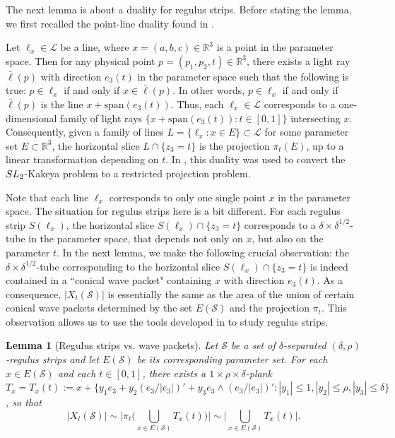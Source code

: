 \documentclass{amsart}%
\numberwithin{equation}{section}
\newtheorem{lemma}[theorem]{Lemma}
\newcommand{\de}{\delta}
\newcommand{\cs}{\mathcal S}
\newcommand{\cl}{\mathcal L}
\newcommand{\ZR}{\mathbb{R}}
\newcommand{\SL}{{\rm{SL}}}
\newcommand{\1}{\mathbbm{1}}
\begin{document}
\smallskip

The next lemma is about a duality for regulus strips.
Before stating the lemma, we first recalled the point-line duality found in \cite{FO}.

Let $\ell_{x}\in\cl$ be a line, where $x=(a,b,c)\in\ZR^3$ is a point in the parameter space.
Then for any physical point $p=(p_1,p_2,t)\in\ZR^3$, there exists a light ray $\bar\ell(p)$ with direction $e_3(t)$ in the parameter space such that the following is true: $p\in\ell_x$ if and only if $x\in\bar\ell(p)$.
In other words, $p\in\ell_x$ if and only if $\bar\ell(p)$ is the line $x+\text{span}(e_3(t))$.
Thus, each $\ell_x\in\cl$ corresponds to a one-dimensional family of light rays $\{x+\text{span}(e_3(t)):t\in[0,1]\}$ intersecting $x$.
Consequently, given a family of lines $L=\{\ell_x:x\in E\}\subset\cl$ for some parameter set $E\subset\ZR^3$, the horizontal slice $L\cap \{z_3=t\}$ is the projection $\pi_t(E)$, up to a linear transformation depending on $t$.
In \cite{FO}, this duality was used to convert the $\SL_2$-Kakeya problem to a restricted projection problem.

Note that each line $\ell_x$ corresponds to only one single point $x$ in the parameter space.
The situation for regulus strips here is a bit different.
For each regulus strip $S(\ell_x)$, the horizontal slice $S(\ell_x)\cap \{z_3=t\}$ corresponds to a $\de\times\de^{1/2}$-tube in the parameter space, that depends not only on $x$, but also on the parameter $t$.
In the next lemma, we make the following crucial observation: the $\de\times\de^{1/2}$-tube corresponding to the horizontal slice $S(\ell_x)\cap \{z_3=t\}$ is indeed contained in a ``conical wave packet" containing $x$ with direction $e_3(t)$.
As a consequence, $|X_t(\cs)|$ is essentially the same as the area of the union of certain conical wave packets determined by the set $E(\cs)$ and the projection $\pi_t$.
This observation allows us to use the tools developed in \cite{GGGHMW} to study regulus strips.


\begin{lemma}[Regulus strips vs. wave packets]
\label{rs-wp}
Let $\cs$ be a set of $\de$-separated $(\de,\rho)$-regulus strips and let $E(\cs)$ be its corresponding parameter set. 
For each $x\in E(\cs)$ and each $t\in[0,1]$, there exists a $1\times\rho\times\de$-plank $T_x=T_x(t):=x+\{y_1e_3+y_2(e_3/|e_3|)'+y_3e_3\wedge (e_3/|e_3|)': |y_1|\leq1, |y_2|\leq \rho, |y_3|\leq\de\}$, so that 
\begin{equation}
    |X_t(\cs)|\sim \Big|\pi_t\Big(\bigcup_{x\in E(\cs)} T_x(t)\Big)\Big|\sim \Big|\bigcup_{x\in E(\cs)} T_x(t)\Big|.
\end{equation}
\end{lemma}
\end{document}
